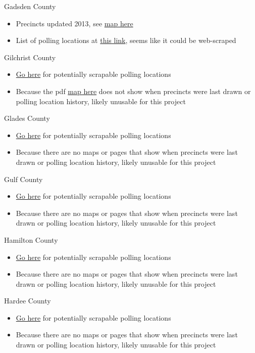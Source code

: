 \documentclass[12pt]{article}
\begin{document}
Gadsden County
\begin{itemize}
  \item Precincts updated 2013, see \href{https://www.voterfocus.com/PrecinctFinder/precinctDirectory?county=FL-GAD}{map here}
  \item List of polling locations at \href{https://www.voterfocus.com/PrecinctFinder/precinctDirectory?county=FL-GAD}{this link},  seems like it could be web-scraped
\end{itemize}
Gilchrist County
\begin{itemize}
  \item \href{https://www.voterfocus.com/PrecinctFinder/precinctDirectory?county=FL-GIL}{Go here} for potentially scrapable polling locations
  \item Because the pdf \href{https://www.votegilchrist.com/Portals/Gilchrist/Documents/cm_voter__comm_dist.pdf}{map here} does not show when precincts were last drawn or polling location history, likely unusable for this project
\end{itemize}
Glades County
\begin{itemize}
  \item \href{https://www.voterfocus.com/PrecinctFinder/precinctDirectory?county=FL-GLA}{Go here} for potentially scrapable polling locations
  \item Because there are no maps or pages that show when precincts were last drawn or polling location history, likely unusable for this project
\end{itemize}
Gulf County
\begin{itemize}
  \item \href{https://www.voterfocus.com/PrecinctFinder/precinctDirectory?county=FL-GUL}{Go here} for potentially scrapable polling locations
  \item Because there are no maps or pages that show when precincts were last drawn or polling location history, likely unusable for this project
\end{itemize}
Hamilton County
\begin{itemize}
  \item \href{https://www.voterfocus.com/PrecinctFinder/precinctDirectory?county=FL-HAM}{Go here} for potentially scrapable polling locations
  \item Because there are no maps or pages that show when precincts were last drawn or polling location history, likely unusable for this project
\end{itemize}
Hardee County
\begin{itemize}
  \item \href{https://www.voterfocus.com/PrecinctFinder/precinctDirectory?county=FL-HAR}{Go here} for potentially scrapable polling locations
  \item Because there are no maps or pages that show when precincts were last drawn or polling location history, likely unusable for this project
\end{itemize}
\end{document}
